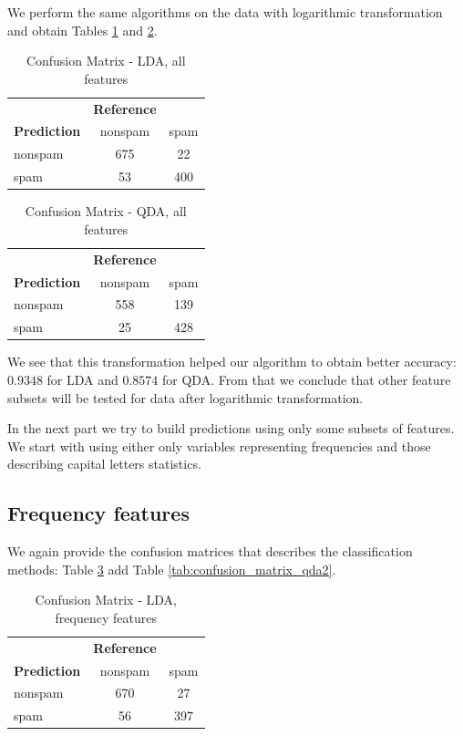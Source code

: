 \documentclass{article}\usepackage[]{graphicx}\usepackage[]{xcolor}
\begin{document}
We perform the same algorithms on the data with logarithmic transformation and 
obtain Tables \ref{tab:confusion_matrix_lda1_log} and \ref{tab:confusion_matrix_qda1_log}.
	
	\begin{table}[h]
		\centering
		\begin{tabular}{lcc}
			& \textbf{Reference} & \\
			\textbf{Prediction} & nonspam & spam \\
			nonspam & 675 & 22 \\
			spam & 53 & 400 \\
		\end{tabular}
		\caption{Confusion Matrix - LDA, all features}
		\label{tab:confusion_matrix_lda1_log}
	\end{table}
	
	\begin{table}[h]
		\centering
		\begin{tabular}{lcc}
			& \textbf{Reference} & \\
			\textbf{Prediction} & nonspam & spam \\
			nonspam & 558 & 139 \\
			spam & 25 & 428 \\
		\end{tabular}
		\caption{Confusion Matrix - QDA, all features}
		\label{tab:confusion_matrix_qda1_log}
	\end{table}
	
We see that this transformation helped our algorithm to obtain better accuracy: 
$0.9348$ for LDA and $0.8574$ for QDA. From that we conclude that other feature 
subsets will be tested for data after logarithmic transformation.

In the next part we try to build predictions using only some subsets of features. 
We start with using either only variables representing frequencies and those describing capital letters statistics.

\subsection*{Frequency features}

We again provide the confusion matrices that describes the classification methods: 
Table \ref{tab:confusion_matrix_lda2} add Table \ref{tab:confusion_matrix_qda2}.
	
	\begin{table}[h]
		\centering
		\begin{tabular}{lcc}
			& \textbf{Reference} & \\
			\textbf{Prediction} & nonspam & spam \\
			nonspam & 670 & 27 \\
			spam & 56 & 397 \\
		\end{tabular}
		\caption{Confusion Matrix - LDA, frequency features}
		\label{tab:confusion_matrix_lda2}
	\end{table}
	
\end{document}
